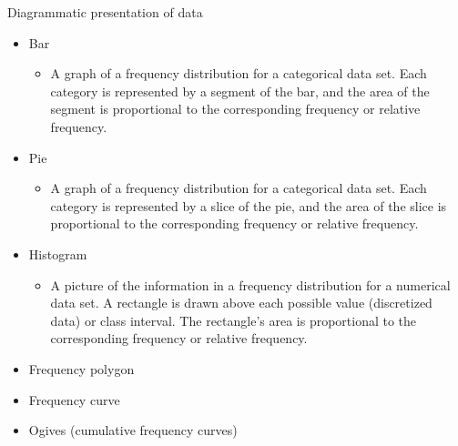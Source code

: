 \documentclass[
  ignorenonframetext,
  aspectratio=169]{beamer}
\providecommand{\tightlist}{%
  \setlength{\itemsep}{0pt}\setlength{\parskip}{0pt}}
\begin{document}
\begin{frame}{Diagrammatic presentation of data}
\protect\hypertarget{diagrammatic-presentation-of-data}{}
\begin{itemize}
\tightlist
\item
  Bar

  \begin{itemize}
  \tightlist
  \item
    A graph of a frequency distribution for a categorical data set. Each
    category is represented by a segment of the bar, and the area of the
    segment is proportional to the corresponding frequency or relative
    frequency.
  \end{itemize}
\item
  Pie

  \begin{itemize}
  \tightlist
  \item
    A graph of a frequency distribution for a categorical data set. Each
    category is represented by a slice of the pie, and the area of the
    slice is proportional to the corresponding frequency or relative
    frequency.
  \end{itemize}
\item
  Histogram

  \begin{itemize}
  \tightlist
  \item
    A picture of the information in a frequency distribution for a
    numerical data set. A rectangle is drawn above each possible value
    (discretized data) or class interval. The rectangle's area is
    proportional to the corresponding frequency or relative frequency.
  \end{itemize}
\item
  Frequency polygon
\item
  Frequency curve
\item
  Ogives (cumulative frequency curves)
\end{itemize}
\end{frame}
\end{document}
